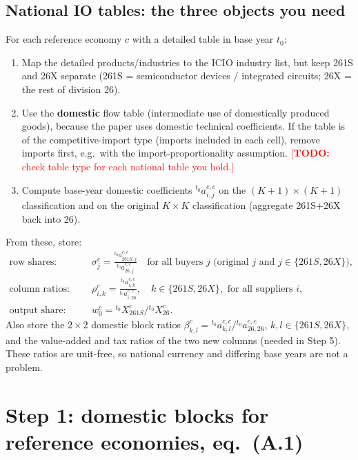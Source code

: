 \documentclass[11pt,a4paper]{article}
\theoremstyle{remark}
\theoremstyle{definition}
\newcommand{\sem}{{261S}}   %
\newcommand{\oth}{{26X}}    %
\newcommand{\agg}{{26}}     %
\newcommand{\todo}[1]{\textcolor{red}{[\textbf{TODO:} #1]}}
\begin{document}
\subsection{National IO tables: the three objects you need}
For each reference economy $c$ with a detailed table in base year $t_0$:
\begin{enumerate}
  \item Map the detailed products/industries to the ICIO industry list, but keep \sem{} and \oth{} separate
        (\sem{} = semiconductor devices / integrated circuits; \oth{} = the rest of division 26).
  \item Use the \textbf{domestic} flow table (intermediate use of domestically produced goods), because the
        paper uses domestic technical coefficients. If the table is of the competitive-import type (imports
        included in each cell), remove imports first, e.g.\ with the import-proportionality assumption.
        \todo{check table type for each national table you hold.}
  \item Compute base-year domestic coefficients ${}^{t_0}a^{c,c}_{i,j}$ on the $(K+1)\times(K+1)$ classification and
        on the original $K\times K$ classification (aggregate \sem+\oth{} back into \agg).
\end{enumerate}
From these, store:
\begin{align}
  \text{row shares:}\qquad & \sigma^c_j = \frac{{}^{t_0}a^{c,c}_{\sem,j}}{{}^{t_0}a^{c,c}_{\agg,j}}
     \quad\text{for all buyers } j \text{ (original } j \text{ and } j\in\{\sem,\oth\}), \label{eq:sigma}\\
  \text{column ratios:}\qquad & \rho^c_{i,k} = \frac{{}^{t_0}a^{c,c}_{i,k}}{{}^{t_0}a^{c,c}_{i,\agg}},
     \quad k\in\{\sem,\oth\}, \text{ for all suppliers } i, \label{eq:rho}\\
  \text{output share:}\qquad & w^c_0 = {}^{t_0}X^c_\sem / {}^{t_0}X^c_\agg . \label{eq:w0}
\end{align}
Also store the $2\times2$ domestic block ratios
$\beta^c_{k,l} = {}^{t_0}a^{c,c}_{k,l}/{}^{t_0}a^{c,c}_{\agg,\agg}$, $k,l\in\{\sem,\oth\}$,
and the value-added and tax ratios of the two new columns (needed in Step 5).
These ratios are unit-free, so national currency and differing base years are not a problem.

\section{Step 1: domestic blocks for reference economies, eq.~(A.1)}
\end{document}
